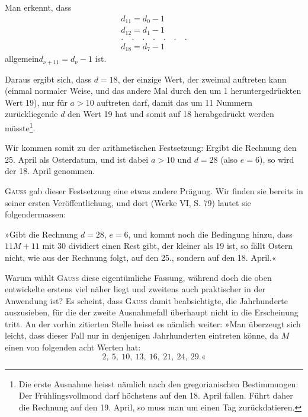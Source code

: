 \clearpage\begingroup{}
\renewcommand{\thefootnote}{\arabic{footnote})}\setcounter{footnote}{0}
\noindent\hspace*{\parindent}Man erkennt, dass
\[
\begin{gathered}
d_{11}=d_0-1\\
d_{12}=d_1-1\\
\mathord{.}\quad\mathord{.}\quad\mathord{.}\quad\mathord{.}\quad\mathord{.}\quad\mathord{.}\quad\mathord{.}\\
d_{18}=d_7-1
\end{gathered}
\]
\noindent\hspace*{3em}allgemein\quad $d_{\nu+11}=d_\nu-1$ ist.

Daraus ergibt sich, dass $d=18$, der einzige Wert, der zweimal auftreten
kann (einmal normaler Weise, und das andere Mal durch den um 1 heruntergedrückten Wert 19), nur für $a>10$ auftreten darf, damit das um 11
Nummern zurückliegende $d$ den Wert 19 hat und somit auf 18 herabgedrückt
werden müsste\footnote{Die erste Ausnahme heisst nämlich nach den gregorianischen Bestimmungen: Der Frühlingsvollmond darf höchstens auf den 18. April fallen. Führt daher die Rechnung auf den 19. April, so muss man
um einen Tag zurückdatieren.}.

Wir kommen somit zu der arithmetischen Festsetzung: Ergibt die Rechnung den 25. April als Osterdatum, und ist dabei $a>10$ und $d=28$ (also
$e=6$), so wird der 18. April genommen.

\textsc{Gauss} gab dieser Festsetzung eine etwas andere Prägung. Wir finden
sie bereits in seiner ersten Veröffentlichung, und dort (Werke VI, S. 79)
lautet sie folgendermassen:

»Gibt die Rechnung $d=28$, $e=6$, und kommt noch die Bedingung
hinzu, dass $11M+11$ mit 30 dividiert einen Rest gibt, der kleiner als 19
ist, so fällt Ostern nicht, wie aus der Rechnung folgt, auf den 25., sondern
auf den 18. April.«

Warum wählt \textsc{Gauss} diese eigentümliche Fassung, während doch die
oben entwickelte erstens viel näher liegt und zweitens auch praktischer in
der Anwendung ist? Es scheint, dass \textsc{Gauss} damit beabsichtigte, die Jahrhunderte auszusieben, für die der zweite Ausnahmefall überhaupt nicht in
die Erscheinung tritt. An der vorhin zitierten Stelle heisst es nämlich weiter:
»Man überzeugt sich leicht, dass dieser Fall nur in denjenigen Jahrhunderten
eintreten könne, da $M$ einen von folgenden acht Werten hat:
\[
2,\ 5,\ 10,\ 13,\ 16,\ 21,\ 24,\ 29.\text{«}
\]

